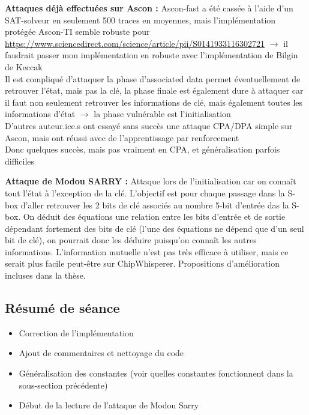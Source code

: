 \documentclass[12pt]{article}
\begin{document}
	\noindent \textbf{Attaques déjà effectuées sur Ascon :} Ascon-fast a été cassée à l'aide d'un SAT-solveur en seulement 500 traces en moyennes, mais l'implémentation protégée Ascon-TI semble robuste pour \url{https://www.sciencedirect.com/science/article/pii/S0141933116302721} $\rightarrow$ il faudrait passer mon implémentation en robuste avec l'implémentation de Bilgin de Keccak\\
	Il est compliqué d'attaquer la phase d'associated data permet éventuellement de retrouver l'état, mais pas la clé, la phase finale est également dure à attaquer car il faut non seulement retrouver les informations de clé, mais également toutes les informations d'état $\rightarrow$ la phase vulnérable est l'initialisation\\
	D'autres auteur.ice.s ont essayé sans succès une attaque CPA/DPA simple sur Ascon, mais ont réussi avec de l'apprentissage par renforcement\\
	Donc quelques succès, mais pas vraiment en CPA, et généralisation parfois difficiles
	
	\noindent \textbf{Attaque de Modou SARRY :} Attaque lors de l'initialisation car on connaît tout l'état à l'exception de la clé. L'objectif est pour chaque passage dans la S-box d'aller retrouver les 2 bits de clé associés au nombre 5-bit d'entrée das la S-box. On déduit des équations une relation entre les bits d'entrée et de sortie dépendant fortement des bits de clé (l'une des équations ne dépend que d'un seul bit de clé), on pourrait donc les déduire puisqu'on connaît les autres informations. L'information mutuelle n'est pas très efficace à utiliser, mais ce serait plus facile peut-être sur ChipWhisperer. Propositions d'amélioration incluses dans la thèse.
	
	\subsection{Résumé de séance}
	\begin{itemize}
		\item Correction de l'implémentation
		\item Ajout de commentaires et nettoyage du code
		\item Généralisation des constantes (voir quelles constantes fonctionnent dans la sous-section précédente)
		\item Début de la lecture de l'attaque de Modou Sarry
	\end{itemize}
	
\end{document}
